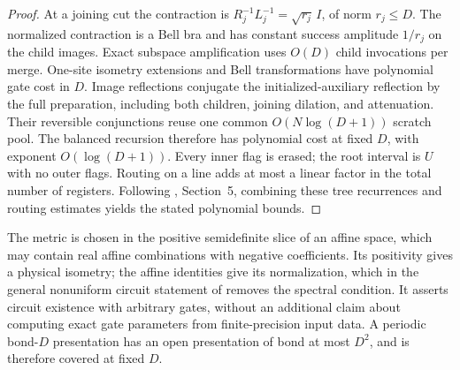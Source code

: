 \begin{proof}
    At a joining cut the contraction is
    $R_j^{-1}L_j^{-1}=\sqrt{r_j}\,I$, of norm $r_j\leq D$.
    The normalized contraction is a Bell bra and has constant
    success amplitude $1/r_j$ on the child images. Exact subspace
    amplification uses $O(D)$ child invocations per merge.
    One-site isometry extensions and Bell transformations have
    polynomial gate cost in $D$. Image reflections conjugate the initialized-auxiliary reflection
    by the full preparation, including both children, joining dilation,
    and attenuation. Their reversible conjunctions reuse one common
    $O(N\log(D+1))$ scratch pool. The balanced recursion therefore
    has polynomial cost at fixed $D$, with exponent $O(\log(D+1))$.
    Every inner flag is erased; the root interval is $U$
    with no outer flags. Routing on a line adds at most a linear
    factor in the total number of registers.
    Following \cite{RankTwoMPUCircuits2026}, Section~5, combining these
    tree recurrences and routing estimates yields the stated polynomial bounds.
\end{proof}

The metric is chosen in the positive semidefinite slice of an affine
space, which may contain real affine combinations with negative
coefficients. Its positivity gives a physical isometry; the affine
identities give its normalization, which in the general nonuniform circuit statement of
\cite{Styliaris2025MPUCircuits} removes the spectral
condition. It asserts circuit existence with
arbitrary gates, without an additional claim about computing exact
gate parameters from finite-precision input data. A periodic bond-$D$
presentation has an open presentation of bond at most $D^2$, and is
therefore covered at fixed $D$.
